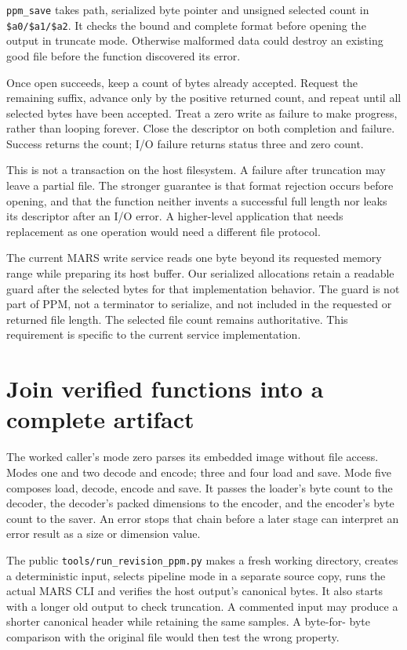 \texttt{ppm\_save} takes path, serialized byte pointer and unsigned selected
count in \texttt{\$a0/\$a1/\$a2}. It checks the bound and complete format
before opening the output in truncate mode. Otherwise malformed data could destroy
an existing good file before the function discovered its error.

Once open succeeds, keep a count of bytes already accepted. Request the remaining
suffix, advance only by the positive returned count, and repeat until all selected
bytes have been accepted. Treat a zero write as failure to make progress, rather
than looping forever. Close the descriptor on both completion and failure.
Success returns the count; I/O failure returns status three and zero count.

This is not a transaction on the host filesystem. A failure after truncation may
leave a partial file. The stronger guarantee is that format rejection occurs
before opening, and that the function neither invents a successful full length
nor leaks its descriptor after an I/O error. A higher-level application that
needs replacement as one operation would need a different file protocol.

The current MARS write service reads one byte beyond its requested memory range
while preparing its host buffer. Our serialized allocations retain a readable
guard after the selected bytes for that implementation behavior. The guard is
not part of PPM, not a terminator to serialize, and not included in the requested
or returned file length. The selected file count remains authoritative. This
requirement is specific to the current service implementation.

\section{Join verified functions into a complete artifact}

The worked caller's mode zero parses its embedded image without file access.
Modes one and two decode and encode; three and four load and save. Mode five
composes load, decode, encode and save. It passes the loader's byte count to the
decoder, the decoder's packed dimensions to the encoder, and the encoder's byte
count to the saver. An error stops that chain before a later stage can interpret
an error result as a size or dimension value.

The public \texttt{tools/run\_revision\_ppm.py} makes a fresh working directory,
creates a deterministic input, selects pipeline mode in a separate source copy,
runs the actual MARS CLI and verifies the host output's canonical bytes. It also
starts with a longer old output to check truncation. A commented input may
produce a shorter canonical header while retaining the same samples. A byte-for-
byte comparison with the original file would then test the wrong property.

